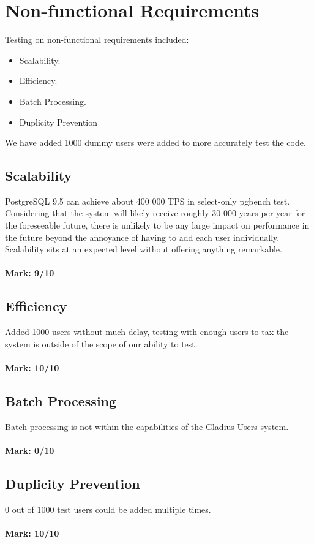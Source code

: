 \documentclass[12pt]{article}
\begin{document}
\pagebreak
\section{Non-functional Requirements}
	Testing on non-functional requirements included:\\
	
	\begin{itemize}
		\item Scalability.
		\item Efficiency.
		\item Batch Processing.
		\item Duplicity Prevention
	\end{itemize}
	
	We have added 1000 dummy users were added to more accurately test the code.
	
\subsection{Scalability}
	PostgreSQL 9.5 can achieve about 400 000 TPS in select-only pgbench test. Considering that the system will likely receive roughly 30 000 years per year for the foreseeable 		future, there is unlikely to be any large impact on performance in the future beyond the annoyance of having to add each user individually. Scalability sits at an expected level 		without offering anything remarkable. \\ \\
	\textbf{Mark: 9/10}
	
\subsection{Efficiency} 
	Added 1000 users without much delay, testing with enough users to tax the system is outside of the scope of our ability to test. \\ \\ 
	\textbf{Mark: 10/10} 
	
\subsection{Batch Processing}
	Batch processing is not within the capabilities of the Gladius-Users system.\\ \\ 
	\textbf{Mark: 0/10}
	
\subsection{Duplicity Prevention}
	0 out of 1000 test users could be added multiple times. \\ \\ 
	\textbf{Mark: 10/10}
\end{document}
